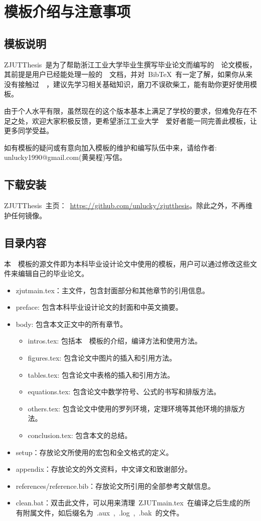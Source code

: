 
\chapter{模板介绍与注意事项}
\section{模板说明}

ZJUTThesis~是为了帮助浙江工业大学毕业生撰写毕业论文而编写的~\XeLaTeX~论文模板，其前提是用户已经能处理一般的~\XeLaTeX~文档，并对~BibTeX~有一定了解，如果你从来没有接触过~\XeLaTeX~，建议先学习相关基础知识，磨刀不误砍柴工，能有助你更好使用模板\cite{huwei}。

由于个人水平有限，虽然现在的这个版本基本上满足了学校的要求，但难免存在不足之处，欢迎大家积极反馈，更希望浙江工业大学~\XeLaTeX~爱好者能一同完善此模板，让更多同学受益。

如有模板的疑问或有意向加入模板的维护和编写队伍中来，请给作者: unlucky1990@gmail.com(黄昊程)写信。

\section{下载安装}
ZJUTThesis~主页：~\url{https://github.com/unlucky/zjutthesis}。除此之外，不再维护任何镜像。

\section{目录内容}
本~\XeLaTeX{}~模板的源文件即为本科毕业设计论文中使用的模板，用户可以通过修改这些文件来编辑自己的毕业论文。
\begin{itemize}
\item{zjutmain.tex}：主文件，包含封面部分和其他章节的引用信息。
\item{preface}: 包含本科毕业设计论文的封面和中英文摘要。
\item{body}: 包含本文正文中的所有章节。
\begin{itemize}
\item{intros.tex}: 包括本~\XeLaTeX{}~模板的介绍，编译方法和使用方法。
\item{figures.tex}: 包含论文中图片的插入和引用方法。
\item{tables.tex}: 包含论文中表格的插入和引用方法。
\item{equations.tex}: 包含论文中数学符号、公式的书写和排版方法。
\item{others.tex}: 包含论文中使用的罗列环境，定理环境等其他环境的排版方法。
\item{conclusion.tex}: 包含本文的总结。
\end{itemize}
\item{setup}：存放论文所使用的宏包和全文格式的定义。
\item{appendix}：存放论文的外文资料，中文译文和致谢部分。
\item{references/reference.bib}：存放论文所引用的全部参考文献信息。
\item{clean.bat}：双击此文件，可以用来清理~ZJUTmain.tex~在编译之后生成的所有附属文件，如后缀名为~.aux~,~.log~,~.bak~的文件。
\end{itemize}

